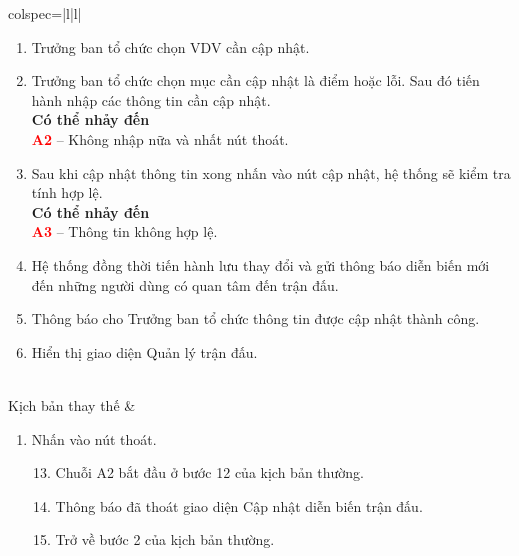 \documentclass{article}
\begin{document}
\begin{longtblr}[caption = {Đặc tả usecase Cập nhật diễn biến trận đấu},
  label = {tab:usecase1-spec},]{colspec={|l|l|}}
\begin{minipage}{5in}
\begin{enumerate}
                \item Trưởng ban tổ chức chọn VDV cần cập nhật.
                \item Trưởng ban tổ chức chọn mục cần cập nhật là điểm hoặc lỗi. Sau đó tiến hành nhập các thông tin cần cập nhật.\\
                    \textbf{Có thể nhảy đến}\\
                    \textbf{\textcolor{red}{A2}} -- Không nhập nữa và nhất nút thoát.
                \item Sau khi cập nhật thông tin xong nhấn vào nút cập nhật, hệ thống sẽ kiểm tra tính hợp lệ.\\
                    \textbf{Có thể nhảy đến}\\
                    \textbf{\textcolor{red}{A3}} -- Thông tin không hợp lệ.
                \item Hệ thống đồng thời tiến hành lưu thay đổi và gửi thông báo diễn biến mới đến những người dùng có quan tâm đến trận đấu. 
                \item Thông báo cho Trưởng ban tổ chức thông tin được cập nhật thành công.
                \item Hiển thị giao diện Quản lý trận đấu.        
            \end{enumerate}
            \vskip 1pt
        \end{minipage}    
    \\\hline
    Kịch bản thay thế & 
        \begin{minipage}{5in}
            \vskip 4pt
            \begin{enumerate}[label={\textbf{\textcolor{red}{A\arabic*}} --}, align=left, itemsep=-5pt, start=2]
                \item  Nhấn vào nút thoát.  \\
                \vspace{-2em}
                \begin{enumerate}[leftmargin=-5px, align=left, label=\arabic*.]
                    \setcounter{enumii}{12}
                    \item[]
                    \hspace{-25px} Chuỗi A2 bắt đầu ở bước 12 của kịch bản thường.
                    \item Thông báo đã thoát giao diện Cập nhật diễn biến trận đấu.
                    \item[]
                    \hspace{-25px} Trở về bước 2 của kịch bản thường.

\end{enumerate}
\end{enumerate}
\end{minipage}
\end{longtblr}
\end{document}
